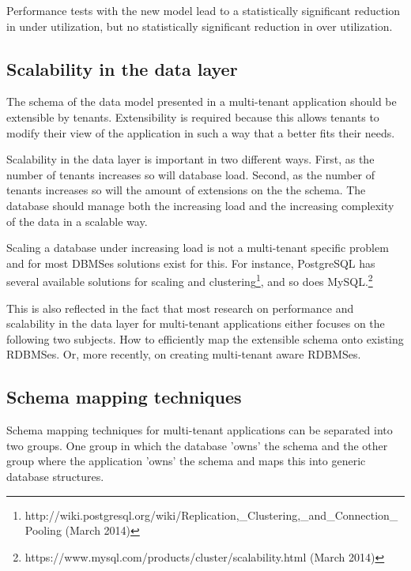 Performance tests with the new model lead to a statistically significant reduction in under utilization, but no statistically significant reduction in over utilization.


\subsection{Scalability in the data layer}
The schema of the data model presented in a multi-tenant application should be extensible by tenants.
Extensibility is required because this allows tenants to modify their view of the application in such a way that a better fits their needs.

Scalability in the data layer is important in two different ways.
First, as the number of tenants increases so will database load.
Second, as the number of tenants increases so will the amount of extensions on the the schema. 
The database should manage both the increasing load and the increasing complexity of the data in a scalable way.

Scaling a database under increasing load is not a multi-tenant specific problem and for most DBMSes solutions exist for this. 
For instance, PostgreSQL has several available solutions for scaling and clustering\footnote{http://wiki.postgresql.org/wiki/Replication,\_Clustering,\_and\_Connection\_Pooling (March 2014)}, and so does MySQL.\footnote{https://www.mysql.com/products/cluster/scalability.html (March 2014)}

This is also reflected in the fact that most research on performance and scalability in the data layer for multi-tenant applications either focuses on the following two subjects.
How to efficiently map the extensible schema onto existing RDBMSes.\cite{aulbach2008multi, aulbach2009comparison} 
Or, more recently, on creating multi-tenant aware RDBMSes.\cite{schiller2011native, aulbach2011extensibility} 

\subsection{Schema mapping techniques}
Schema mapping techniques for multi-tenant applications can be separated into two groups. 
One group in which the database 'owns' the schema  and the other group where the application 'owns' the schema and maps this into generic database structures.\cite{aulbach2009comparison}

